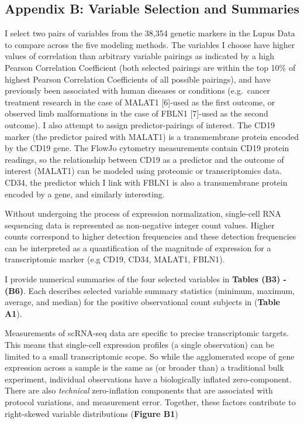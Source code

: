 \documentclass[12pt,]{article}
\begin{document}
\hypertarget{appendix-b-variable-selection-and-summaries}{%
\subsection{Appendix B: Variable Selection and
Summaries}\label{appendix-b-variable-selection-and-summaries}}

I select two pairs of variables from the 38,354 genetic markers in the
Lupus Data to compare across the five modeling methods. The variables I
choose have higher values of correlation than arbitrary variable
pairings as indicated by a high Pearson Correlation Coefficient (both
selected pairings are within the top 10\% of highest Pearson Correlation
Coefficients of all possible pairings), and have previously been
associated with human diseases or conditions (e.g.~cancer treatment
research in the case of MALAT1 {[}6{]}-used as the first outcome, or
observed limb malformations in the case of FBLN1 {[}7{]}-used as the
second outcome). I also attempt to assign predictor-pairings of
interest. The CD19 marker (the predictor paired with MALAT1) is a
transmembrane protein encoded by the CD19 gene. The FlowJo cytometry
measurements contain CD19 protein readings, so the relationship between
CD19 as a predictor and the outcome of interest (MALAT1) can be modeled
using proteomic or transcriptomics data. CD34, the predictor which I
link with FBLN1 is also a transmembrane protein encoded by a gene, and
similarly interesting.

Without undergoing the process of expression normalization, single-cell
RNA sequencing data is represented as non-negative integer count values.
Higher counts correspond to higher detection frequencies and these
detection frequencies can be interpreted as a quantification of the
magnitude of expression for a transcriptomic marker (e.g CD19, CD34,
MALAT1, FBLN1).

I provide numerical summaries of the four selected variables in
\textbf{Tables (B3) - (B6)}. Each describes selected variable summary
statistics (minimum, maximum, average, and median) for the positive
observational count subjects in (\textbf{Table A1}).

Measurements of scRNA-seq data are specific to precise transcriptomic
targets. This means that single-cell expression profiles (a single
observation) can be limited to a small transcriptomic scope. So while
the agglomerated scope of gene expression across a sample is the same as
(or broader than) a traditional bulk experiment, individual observations
have a biologically inflated zero-component. There are also
\textit{technical} zero-inflation components that are associated with
protocol variations, and measurement error. Together, these factors
contribute to right-skewed variable distributions (\textbf{Figure B1})
\end{document}
